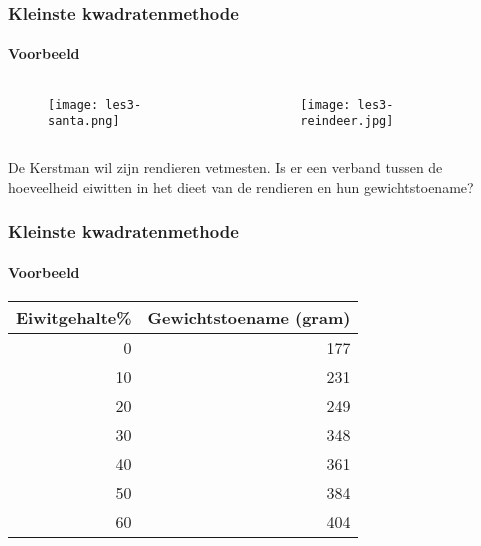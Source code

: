 \documentclass[aspectratio=169]{beamer}
\begin{document}
\begin{frame}[plain]
  \frametitle{Kleinste kwadratenmethode}
  \framesubtitle{Voorbeeld}
  \begin{columns}
    \begin{column}{0.5\textwidth}
      
      \begin{figure}
        \centering
        \texttt{[image: les3-santa.png]}
        \label{fig:les3-santa}
      \end{figure}
      
    \end{column}
    \begin{column}{0.5\textwidth}
      
      \begin{figure}
        \centering
        \texttt{[image: les3-reindeer.jpg]}
        \label{fig:les3-reindeer}
      \end{figure}
      
    \end{column}
  \end{columns}

  \bigskip
  De Kerstman wil zijn rendieren vetmesten. Is er een verband
  tussen de hoeveelheid eiwitten in het dieet van de rendieren
  en hun gewichtstoename?
  
\end{frame}

\begin{frame}
  \frametitle{Kleinste kwadratenmethode}
  \framesubtitle{Voorbeeld}
  
  \begin{table}[h]
    \centering
    \small
    \begin{tabular}{@{}rr@{}} \toprule
      Eiwitgehalte\%& Gewichtstoename (gram)  \\
      \midrule
      0   & 177 \\
      10  & 231 \\
      20  & 249 \\
      30  & 348 \\
      40  & 361 \\
      50  & 384 \\
      60  & 404 \\
      \bottomrule
    \end{tabular}
  \end{table}
\end{frame}
\end{document}
